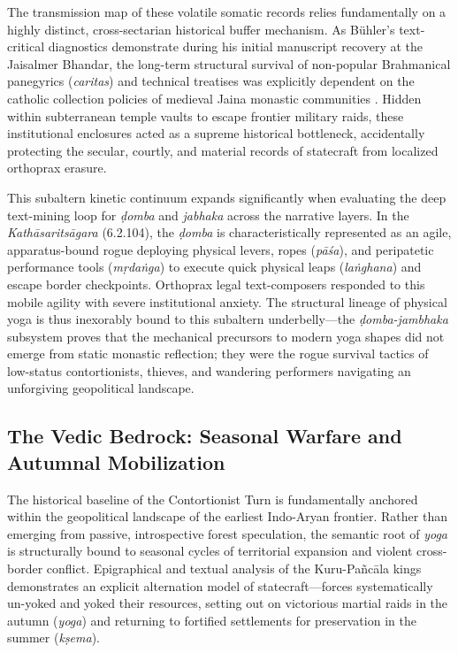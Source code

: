 \documentclass[11pt,twoside,letterpaper]{article}
\begin{document}
The transmission map of these volatile somatic records relies fundamentally on a highly distinct, cross-sectarian historical buffer mechanism. As Bühler’s text-critical diagnostics demonstrate during his initial manuscript recovery at the Jaisalmer Bhandar, the long-term structural survival of non-popular Brahmanical panegyrics (\textit{caritas}) and technical treatises was explicitly dependent on the catholic collection policies of medieval Jaina monastic communities \citep{Buhler1875}. Hidden within subterranean temple vaults to escape frontier military raids, these institutional enclosures acted as a supreme historical bottleneck, accidentally protecting the secular, courtly, and material records of statecraft from localized orthoprax erasure.

This subaltern kinetic continuum expands significantly when evaluating the deep text-mining loop for \textit{ḍomba} and \textit{jabhaka} across the narrative layers. In the \textit{Kathāsaritsāgara} (6.2.104), the \textit{ḍomba} is characteristically represented as an agile, apparatus-bound rogue deploying physical levers, ropes (\textit{pāśa}), and peripatetic performance tools (\textit{mṛdaṅga}) to execute quick physical leaps (\textit{laṅghana}) and escape border checkpoints. Orthoprax legal text-composers responded to this mobile agility with severe institutional anxiety. The structural lineage of physical yoga is thus inexorably bound to this subaltern underbelly—the \textit{ḍomba-jambhaka} subsystem proves that the mechanical precursors to modern yoga shapes did not emerge from static monastic reflection; they were the rogue survival tactics of low-status contortionists, thieves, and wandering performers navigating an unforgiving geopolitical landscape.

\subsection{The Vedic Bedrock: Seasonal Warfare and Autumnal Mobilization}
The historical baseline of the Contortionist Turn is fundamentally anchored within the geopolitical landscape of the earliest Indo-Aryan frontier. Rather than emerging from passive, introspective forest speculation, the semantic root of \textit{yoga} is structurally bound to seasonal cycles of territorial expansion and violent cross-border conflict. Epigraphical and textual analysis of the Kuru-Pañcāla kings demonstrates an explicit alternation model of statecraft—forces systematically un-yoked and yoked their resources, setting out on victorious martial raids in the autumn (\textit{yoga}) and returning to fortified settlements for preservation in the summer (\textit{kṣema}).
\end{document}
